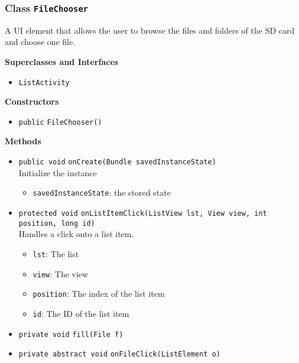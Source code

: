 \subsubsection{Class \lstinline|FileChooser|}
A UI element that allows the user to browse the files and folders of the SD card and
 choose one file. \\



\textbf{Superclasses and Interfaces}
\begin{itemize}
\item \lstinline|ListActivity|
\end{itemize}



\textbf{Constructors}
\begin{itemize}
\item \lstinline|public| \lstinline|FileChooser|\lstinline|()|




\end{itemize}


\textbf{Methods}
\begin{itemize}
\item \lstinline|public void| \lstinline|onCreate|\lstinline|(Bundle savedInstanceState)|\\
Initialize the instance
\begin{itemize}
\item \lstinline|savedInstanceState|: the stored state
\end{itemize}



\item \lstinline|protected void| \lstinline|onListItemClick|\lstinline|(ListView lst, View view, int position, long id)|\\
Handles a click onto a list item.
\begin{itemize}
\item \lstinline|lst|: The list
\item \lstinline|view|: The view
\item \lstinline|position|: The index of the list item
\item \lstinline|id|: The ID of the list item
\end{itemize}



\item \lstinline|private void| \lstinline|fill|\lstinline|(File f)|




\item \lstinline|private abstract void| \lstinline|onFileClick|\lstinline|(ListElement o)|




\end{itemize}

